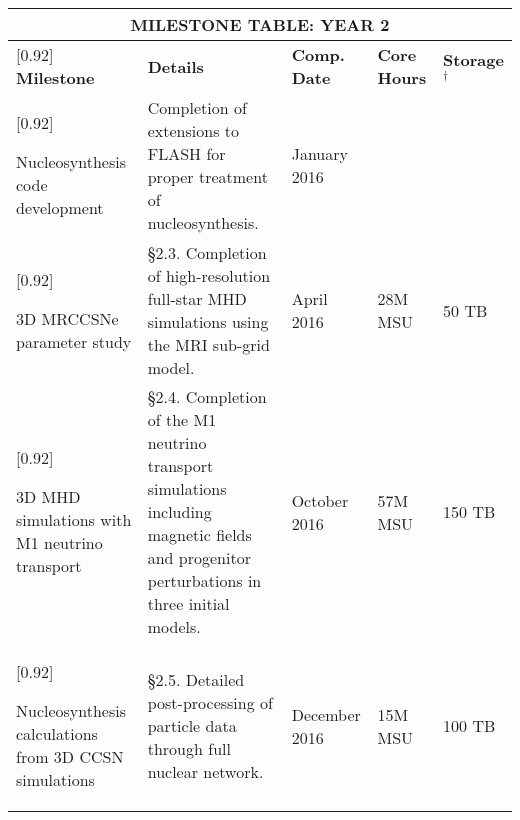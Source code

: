 \documentclass[11pt]{article}
\begin{document}
\begin{table}[b]
\begin{tabular}{|p{2.00in}|p{4.1in}|p{1.00in}|p{0.95in}|p{0.65in}|}
\multicolumn{5}{c}{\textbf{MILESTONE TABLE:  YEAR 2}}\\
\hline\hline
\rowcolor{Gold1}[0.92\tabcolsep]
\textbf{Milestone}&\textbf{Details}&
\textbf{Comp. Date}&\textbf{Core Hours}&
\textbf{Storage$^\dagger$}\\
\hline\hline
\rowcolor{LemonChiffon1}[0.92\tabcolsep]
\raggedright
Nucleosynthesis code development&
%
Completion of extensions to FLASH for proper treatment of nucleosynthesis.&
%
\raggedright
January 2016&
%
&
%

\\
\hline

\rowcolor{Aquamarine1}[0.92\tabcolsep]
\raggedright
3D MRCCSNe parameter study&
%
\S2.3. Completion of high-resolution full-star MHD simulations using
the MRI sub-grid model.&
%
\raggedright
April 2016 &
%
28M MSU&
%
50 TB
\\
\hline
\rowcolor{Aquamarine1}[0.92\tabcolsep]
\raggedright
3D MHD simulations with M1 neutrino transport&
%
\S2.4. Completion of the M1 neutrino transport simulations including magnetic fields and progenitor perturbations in three initial models.&
%
\raggedright
October 2016&
%
57M MSU&
%
150 TB
\\
\hline
\rowcolor{Aquamarine1}[0.92\tabcolsep]
\raggedright
Nucleosynthesis calculations from 3D CCSN simulations&
%
\S2.5. Detailed post-processing of particle data through full nuclear network.&
%
\raggedright
December 2016&
%
15M MSU&
%
100 TB
\\
\hline

\end{tabular}
\end{table}
\end{document}
